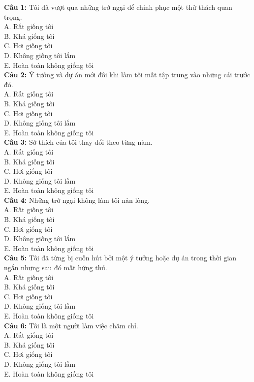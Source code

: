 \begin{multicols}{2}
\noindent
\textbf{Câu 1:} Tôi đã vượt qua những trở ngại để chinh phục một thử thách quan trọng. \\
A. Rất giống tôi \\
B. Khá giống tôi \\
C. Hơi giống tôi \\
D. Không giống tôi lắm \\
E. Hoàn toàn không giống tôi \\

\textbf{Câu 2:} Ý tưởng và dự án mới đôi khi làm tôi mất tập trung vào những cái trước đó. \\
A. Rất giống tôi \\
B. Khá giống tôi \\
C. Hơi giống tôi \\
D. Không giống tôi lắm \\
E. Hoàn toàn không giống tôi \\

\textbf{Câu 3:} Sở thích của tôi thay đổi theo từng năm. \\
A. Rất giống tôi \\
B. Khá giống tôi \\
C. Hơi giống tôi \\
D. Không giống tôi lắm \\
E. Hoàn toàn không giống tôi \\

\textbf{Câu 4:} Những trở ngại không làm tôi nản lòng. \\
A. Rất giống tôi \\
B. Khá giống tôi \\
C. Hơi giống tôi \\
D. Không giống tôi lắm \\
E. Hoàn toàn không giống tôi \\

\textbf{Câu 5:} Tôi đã từng bị cuốn hút bởi một ý tưởng hoặc dự án trong thời gian ngắn nhưng sau đó mất hứng thú. \\
A. Rất giống tôi \\
B. Khá giống tôi \\
C. Hơi giống tôi \\
D. Không giống tôi lắm \\
E. Hoàn toàn không giống tôi \\

\textbf{Câu 6:} Tôi là một người làm việc chăm chỉ. \\
A. Rất giống tôi \\
B. Khá giống tôi \\
C. Hơi giống tôi \\
D. Không giống tôi lắm \\
E. Hoàn toàn không giống tôi \\


\end{multicols}
